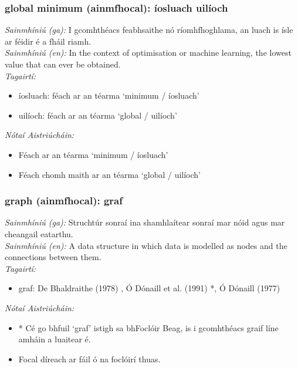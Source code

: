 \subsubsection*{global minimum (ainmfhocal): íosluach uilíoch}
 \noindent \textit{Sainmhíniú (ga):} I gcomhthéacs feabhsaithe nó ríomhfhoghlama, an luach is  ísle ar féidir é a fháil riamh.
\\
 \noindent \textit{Sainmhíniú (en):} In the context of optimisation or machine learning, the lowest value that can ever be obtained.
\\
 \noindent \textit{Tagairtí:}
\begin{itemize}
	\item íosluach: féach ar an téarma `minimum / íosluach'
	\item uilíoch: féach ar an téarma `global / uilíoch'
\end{itemize}

 \noindent \textit{Nótaí Aistriúcháin:}
\begin{itemize}
	\item Féach ar an téarma `minimum / íosluach'
	\item Féach chomh maith ar an téarma `global / uilíoch'
\end{itemize}


\subsubsection*{graph (ainmfhocal): graf}
 \noindent \textit{Sainmhíniú (ga):} Struchtúr sonraí ina shamhlaítear sonraí mar nóid agus mar cheangail eatarthu.
\\
 \noindent \textit{Sainmhíniú (en):} A data structure in which data is modelled as nodes and the connections between them.
\\
 \noindent \textit{Tagairtí:}
\begin{itemize}
	\item graf: De Bhaldraithe (1978) \cite{de-bhaldraithe}, Ó Dónaill et al. (1991) \cite{focloir-beag}*, Ó Dónaill (1977) \cite{odonaill}
\end{itemize}

 \noindent \textit{Nótaí Aistriúcháin:}
\begin{itemize}
	\item * Cé go bhfuil `graf' istigh sa bhFoclóir Beag, is i gcomhthéacs graif líne amháin a luaitear é.
	\item Focal díreach ar fáil ó na foclóirí thuas.
\end{itemize}


